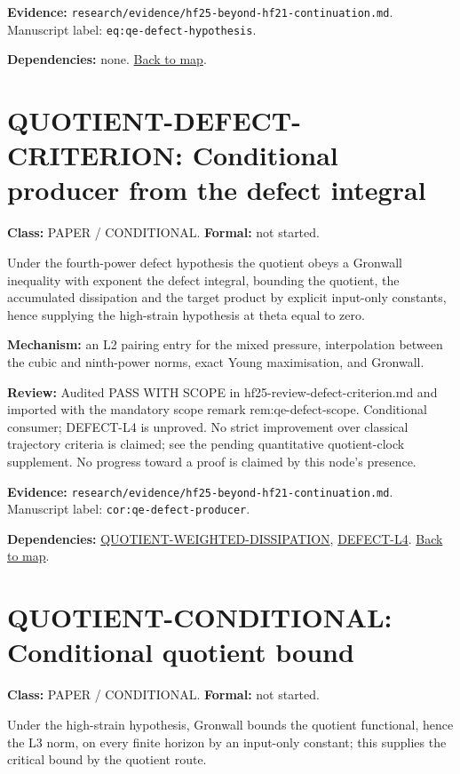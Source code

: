 \documentclass[10pt]{article}
\begin{document}
\textbf{Evidence:} \texttt{research/evidence/hf25-beyond-hf21-continuation.md}. Manuscript label: \texttt{eq:qe-defect-hypothesis}.

\textbf{Dependencies:} none. \hyperref[map]{Back to map}.

\section*{QUOTIENT-DEFECT-CRITERION: Conditional producer from the defect integral}\label{node:QUOTIENT-DEFECT-CRITERION}
\textbf{Class:} PAPER / CONDITIONAL. \textbf{Formal:} not started.

Under the fourth-power defect hypothesis the quotient obeys a Gronwall inequality with exponent the defect integral, bounding the quotient, the accumulated dissipation and the target product by explicit input-only constants, hence supplying the high-strain hypothesis at theta equal to zero.

\textbf{Mechanism:} an L2 pairing entry for the mixed pressure, interpolation between the cubic and ninth-power norms, exact Young maximisation, and Gronwall.

\textbf{Review:} Audited PASS WITH SCOPE in hf25-review-defect-criterion.md and imported with the mandatory scope remark rem:qe-defect-scope. Conditional consumer; DEFECT-L4 is unproved. No strict improvement over classical trajectory criteria is claimed; see the pending quantitative quotient-clock supplement. No progress toward a proof is claimed by this node's presence.

\textbf{Evidence:} \texttt{research/evidence/hf25-beyond-hf21-continuation.md}. Manuscript label: \texttt{cor:qe-defect-producer}.

\textbf{Dependencies:} \hyperref[node:QUOTIENT-WEIGHTED-DISSIPATION]{QUOTIENT-WEIGHTED-DISSIPATION}, \hyperref[node:DEFECT-L4]{DEFECT-L4}. \hyperref[map]{Back to map}.

\section*{QUOTIENT-CONDITIONAL: Conditional quotient bound}\label{node:QUOTIENT-CONDITIONAL}
\textbf{Class:} PAPER / CONDITIONAL. \textbf{Formal:} not started.

Under the high-strain hypothesis, Gronwall bounds the quotient functional, hence the L3 norm, on every finite horizon by an input-only constant; this supplies the critical bound by the quotient route.
\end{document}
